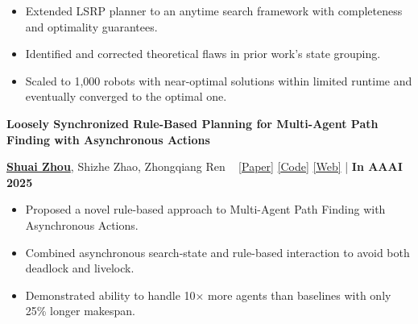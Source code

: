 \documentclass[a4paper,9pt]{extarticle}
\begin{document}
\begin{itemize} 
    \item Extended LSRP planner to an anytime search framework with completeness and optimality guarantees.
    \item Identified and corrected theoretical flaws in prior work's state grouping.
    \item Scaled to 1,000 robots with near-optimal solutions within limited runtime and eventually converged to the optimal one. 
\end{itemize} 
\par\textbf{Loosely Synchronized Rule-Based Planning for
Multi-Agent Path Finding with Asynchronous Actions}
\par\textup{\underline{\textbf{Shuai Zhou}}, Shizhe Zhao, Zhongqiang Ren \  \textbar{} \href{https://doi.org/10.1609/aaai.v39i14.33618}{[Paper]}  \textbar{} \href{https://github.com/rap-lab-org/public_LSRP}{[Code]}  \textbar{} \href{https://rap-lab.github.io/research/mapfaa}{[Web]} \textbar{}  \hfill | \textbf{In AAAI 2025}}  %
\begin{itemize}
    \item  Proposed a novel rule-based approach to Multi-Agent Path Finding with Asynchronous Actions.
    \item Combined asynchronous search-state and rule-based interaction to avoid both deadlock and livelock.
    \item Demonstrated ability to handle 10× more agents than baselines with only 25\% longer makespan.
\end{itemize}
\end{document}
